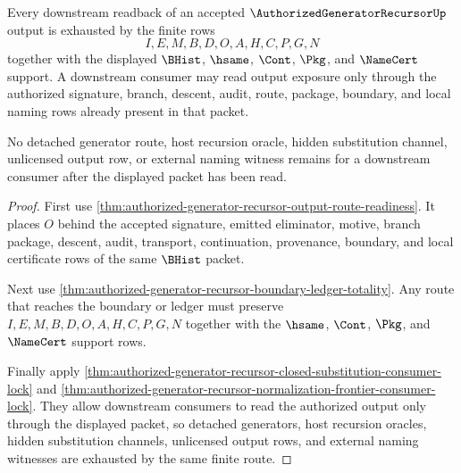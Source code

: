 \begin{theorem}
\label{thm:authorized-generator-recursor-downstream-readback-exhaustion}
Every downstream readback of an accepted $\AuthorizedGeneratorRecursorUp$ output is exhausted by the finite rows
$$
I,E,M,B,D,O,A,H,C,P,G,N
$$
together with the displayed $\BHist$, $\hsame$, $\Cont$, $\Pkg$, and $\NameCert$ support. A downstream consumer may read output exposure only through the authorized signature, branch, descent, audit, route, package, boundary, and local naming rows already present in that packet.

No detached generator route, host recursion oracle, hidden substitution channel, unlicensed output row, or external naming witness remains for a downstream consumer after the displayed packet has been read.
\end{theorem}
\begin{proof}
First use \autoref{thm:authorized-generator-recursor-output-route-readiness}. It places $O$ behind the accepted signature, emitted eliminator, motive, branch package, descent, audit, transport, continuation, provenance, boundary, and local certificate rows of the same $\BHist$ packet.

Next use \autoref{thm:authorized-generator-recursor-boundary-ledger-totality}. Any route that reaches the boundary or ledger must preserve $I,E,M,B,D,O,A,H,C,P,G,N$ together with the $\hsame$, $\Cont$, $\Pkg$, and $\NameCert$ support rows.

Finally apply \autoref{thm:authorized-generator-recursor-closed-substitution-consumer-lock} and \autoref{thm:authorized-generator-recursor-normalization-frontier-consumer-lock}. They allow downstream consumers to read the authorized output only through the displayed packet, so detached generators, host recursion oracles, hidden substitution channels, unlicensed output rows, and external naming witnesses are exhausted by the same finite route.
\end{proof}

